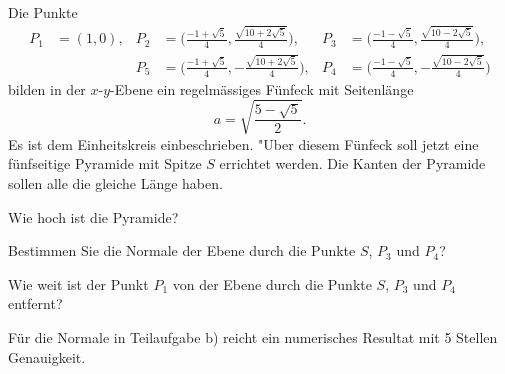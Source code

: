 Die Punkte
\begin{align*}
P_1&=(1,0),
&P_2&=\biggl(\frac{-1+\sqrt{5}}4, \frac{\sqrt{10+2\sqrt{5}}}4 \biggr),
&P_3&=\biggl(\frac{-1-\sqrt{5}}4, \frac{\sqrt{10-2\sqrt{5}}}4 \biggr),\\
&&P_5&=\biggl(\frac{-1+\sqrt{5}}4,-\frac{\sqrt{10+2\sqrt{5}}}4 \biggr),
&P_4&=\biggl(\frac{-1-\sqrt{5}}4,-\frac{\sqrt{10-2\sqrt{5}}}4 \biggr)
\end{align*}
bilden in der $x$-$y$-Ebene ein regelmässiges Fünfeck mit Seitenlänge
\[
a=\sqrt{\frac{5-\sqrt{5}}2}.
\]
Es ist dem Einheitskreis einbeschrieben.
"Uber diesem Fünfeck  soll jetzt eine fünfseitige Pyramide mit
Spitze $S$ errichtet werden.
Die Kanten der Pyramide sollen alle die gleiche Länge haben.
\begin{teilaufgaben}
\item
Wie hoch ist die Pyramide?
\item
Bestimmen Sie die Normale der Ebene durch die Punkte
$S$, $P_3$ und $P_4$?
\item
Wie weit ist der Punkt $P_1$ von der Ebene durch die Punkte
$S$, $P_3$ und $P_4$ entfernt?
\end{teilaufgaben}

\begin{hinweis}
Für die Normale in Teilaufgabe b) reicht ein numerisches Resultat
mit 5 Stellen Genauigkeit.
\end{hinweis}


